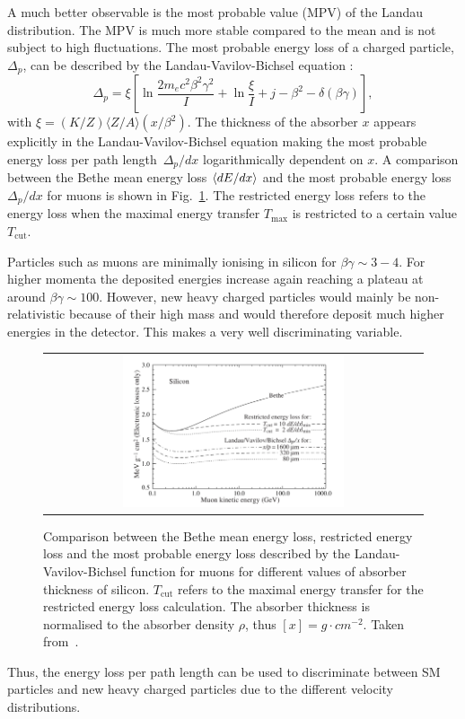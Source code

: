 A much better observable is the most probable value (MPV) of the Landau distribution.
The MPV is much more stable compared to the mean and is not subject to high \dedx fluctuations. 
The most probable energy loss of a charged particle, $\Delta_p$, can be described by the Landau-Vavilov-Bichsel equation \cite{bib:Bichsel:MPV_1988}:
\begin{equation}
\Delta_p = \xi \left[ \ln \frac{2m_e c^2\beta^2\gamma^2}{I}  + \ln\frac{\xi}{I} + j - \beta^2 - \delta(\beta\gamma)  \right],
\label{eq:Landau_Vavilov_Bichsel}
\end{equation}
with $\xi=(K/Z)\langle Z/A \rangle (x/\beta^2)$. 
The thickness of the absorber $x$ appears explicitly in the Landau-Vavilov-Bichsel equation making the most probable energy loss per path \mbox{length $\Delta_p/dx$} logarithmically dependent on $x$.
A comparison between the Bethe mean energy loss $\langle dE/dx \rangle$ and the most probable energy loss $\Delta_p/dx$ for muons is shown in Fig.~\ref{fig:dEdx_Bethe_Landau}.
The restricted energy loss refers to the energy loss when the maximal energy transfer $T_{\text{max}}$ is restricted to a certain value $T_{\text{cut}}$.

Particles such as  muons are minimally ionising in silicon for $\beta\gamma \sim 3-4$. 
For higher momenta the deposited energies increase again reaching a plateau at around $\beta\gamma\sim100$. 
However, new heavy charged particles would mainly be non-relativistic because of their high mass and would therefore deposit much higher energies in the detector.
This makes \dedx  a very well discriminating variable.
\begin{figure}[!t]
  \centering 
  \begin{tabular}{c}
  \includegraphics[width=0.6\textwidth]{figures/analysis_2/dEdx_Bethe_Landau.png}
  \end{tabular}
  \caption{Comparison between the Bethe mean energy loss, restricted energy loss and the most probable energy loss described by the Landau-Vavilov-Bichsel function for muons for different values of absorber thickness of silicon. $T_{\text{cut}}$ refers to the maximal energy transfer for the restricted energy loss calculation. The absorber thickness is normalised to the absorber density $\rho$, thus $[x] = g \cdot cm^{-2}$. Taken from~\cite{bib:PDG_2014}.} 
  \label{fig:dEdx_Bethe_Landau}
\end{figure}
Thus, the energy loss per path length can be used to discriminate between SM particles and new heavy charged particles due to the different velocity distributions.\\

